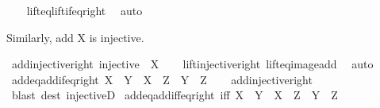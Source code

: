 \begin{isabellebody}
%
\isadelimproof
\ \ %
\endisadelimproof
%
\isatagproof
{}\isamarkupfalse%
\ lift{\isacharunderscore}{\kern0pt}eq{\isacharunderscore}{\kern0pt}lift{\isacharunderscore}{\kern0pt}if{\isacharunderscore}{\kern0pt}eq{\isacharunderscore}{\kern0pt}right\ \isamarkupfalse%
\ auto%
\endisatagproof
{\isafoldproof}%
%
\isadelimproof
%
\endisadelimproof
%
\begin{isamarkuptext}%
Similarly, add X is injective.%
\end{isamarkuptext}\isamarkuptrue%
\isamarkupfalse%
\ add{\isacharunderscore}{\kern0pt}injective{\isacharunderscore}{\kern0pt}right{\isacharcolon}{\kern0pt}\ {\isachardoublequoteopen}injective\ {\isacharparenleft}{\kern0pt}{\isacharparenleft}{\kern0pt}{\isacharplus}{\kern0pt}{\isacharparenright}{\kern0pt}\ X{\isacharparenright}{\kern0pt}{\isachardoublequoteclose}\isanewline
%
\isadelimproof
\ \ %
\endisadelimproof
%
\isatagproof
{}\isamarkupfalse%
\ lift{\isacharunderscore}{\kern0pt}injective{\isacharunderscore}{\kern0pt}right\ lift{\isacharunderscore}{\kern0pt}eq{\isacharunderscore}{\kern0pt}image{\isacharunderscore}{\kern0pt}add\ \isamarkupfalse%
\ auto%
\endisatagproof
{\isafoldproof}%
%
\isadelimproof
\isanewline
%
\endisadelimproof
\isanewline
{}\isamarkupfalse%
\ add{\isacharunderscore}{\kern0pt}eq{\isacharunderscore}{\kern0pt}add{\isacharunderscore}{\kern0pt}if{\isacharunderscore}{\kern0pt}eq{\isacharunderscore}{\kern0pt}right{\isacharcolon}{\kern0pt}\ {\isachardoublequoteopen}X\ {\isacharplus}{\kern0pt}\ Y\ {\isacharequal}{\kern0pt}\ X\ {\isacharplus}{\kern0pt}\ Z\ {\isasymLongrightarrow}\ Y\ {\isacharequal}{\kern0pt}\ Z{\isachardoublequoteclose}\isanewline
%
\isadelimproof
\ \ %
\endisadelimproof
%
\isatagproof
{}\isamarkupfalse%
\ add{\isacharunderscore}{\kern0pt}injective{\isacharunderscore}{\kern0pt}right\ \isamarkupfalse%
\ {\isacharparenleft}{\kern0pt}blast\ dest{\isacharcolon}{\kern0pt}\ injectiveD{\isacharparenright}{\kern0pt}%
\endisatagproof
{\isafoldproof}%
%
\isadelimproof
\isanewline
%
\endisadelimproof
\isanewline
{}\isamarkupfalse%
\ add{\isacharunderscore}{\kern0pt}eq{\isacharunderscore}{\kern0pt}add{\isacharunderscore}{\kern0pt}iff{\isacharunderscore}{\kern0pt}eq{\isacharunderscore}{\kern0pt}right\ {\isacharbrackleft}{\kern0pt}iff{\isacharbrackright}{\kern0pt}{\isacharcolon}{\kern0pt}\ {\isachardoublequoteopen}X\ {\isacharplus}{\kern0pt}\ Y\ {\isacharequal}{\kern0pt}\ X\ {\isacharplus}{\kern0pt}\ Z\ {\isasymlongleftrightarrow}\ Y\ {\isacharequal}{\kern0pt}\ Z{\isachardoublequoteclose}\isanewline

\end{isabellebody}
